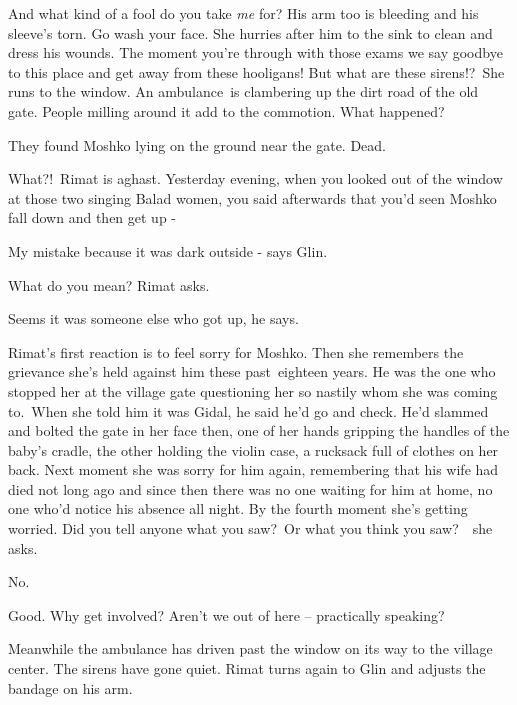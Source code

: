 \documentclass[twoside,11pt]{book}
\begin{document}
{\textquotedbl}And what kind of a fool do you take \textit{me} for?{\textquotedbl} His arm too is bleeding and his
sleeve's torn. {\textquotedbl}Go wash your face.{\textquotedbl} She hurries after him to the sink to clean and dress
his wounds. {\textquotedbl}The moment you're through with those exams we say goodbye to this place and get away from
these hooligans! But what are these sirens!?{\textquotedbl}\ She runs to the window. An ambulance~is clambering up the
dirt road of the old gate. People milling around it add to the commotion. {\textquotedbl}What happened?{\textquotedbl}

{\textquotedbl}They found Moshko lying on the ground near the gate. Dead.{\textquotedbl} 

{\textquotedbl}What?!\ {\textquotedbl}Rimat is aghast{. }{\textquotedbl}Yesterday evening, when you
looked out of the window at those two singing Balad women, you said afterwards that you'd seen Moshko fall down and
then get up -{\textquotedbl} 

{\textquotedbl}My mistake because it was dark outside -{\textquotedbl} says Glin.

{\textquotedbl}What do you mean?{\textquotedbl} Rimat asks. 

{\textquotedbl}Seems it was someone else who got up,{\textquotedbl} he says. 

Rimat's first reaction is to feel sorry for Moshko. Then she remembers the grievance she's held against him these
past{\ }eighteen years. He was the one who stopped her at the village gate questioning her so nastily
whom she was coming to.\ When she told him it was Gidal, he said he'd go and check. He'd slammed and bolted the gate in
her face then, one of her hands gripping the handles of the baby's cradle, the other holding the violin case, a
rucksack full of clothes on her back. Next moment she was sorry for him again, remembering that  his wife had died not
long ago and since then there was no one waiting for him at home, no one who'd notice his absence all night. By the
fourth moment she's getting worried. {\textquotedbl}Did you tell anyone what you saw?\ Or what you think you
saw?{\textquotedbl}\ \ she asks.

{\textquotedbl}No.{\textquotedbl}

{\textquotedbl}Good. Why get involved? Aren't we out of here -- practically speaking?{\textquotedbl} 

Meanwhile the ambulance has driven past the window on its way to the village center. The sirens have gone quiet. Rimat
turns again to Glin and adjusts the bandage on his arm.
\end{document}
